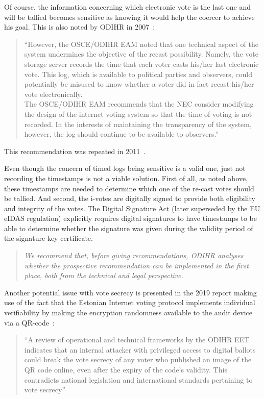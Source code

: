 \documentclass{llncs}
\begin{document}
Of course, the information concerning which  electronic vote is the last one and will be tallied becomes sensitive as knowing it would help the coercer to achieve his goal. This is also noted by ODIHR in 2007~\cite{ODIHR2007}:
\begin{quote}
    ``However, the OSCE/ODIHR EAM noted that one technical aspect of the system undermines the objective of the recast possibility. Namely, the vote storage server records the time that each voter casts his/her last electronic vote. This log, which is available to political parties and observers, could potentially be misused to know whether a voter did in fact recast his/her vote electronically. \\[1ex]
    The OSCE/ODIHR EAM recommends that the NEC consider modifying the design of the internet voting system so that the time of voting is not recorded. In the interests of maintaining the transparency of the system, however, the log should continue to be available to observers.''
\end{quote}
This recommendation was repeated in 2011~\cite{ODIHR2011}.

Even though the concern of timed logs being sensitive is a valid one, just not recording the timestamps is not a viable solution. First of all, as noted above, these timestamps are needed to determine which one of the re-cast votes should be tallied. And second, the i-votes are digitally signed to provide both eligibility and integrity of the votes. The Digital Signature Act (later superseded by the EU eIDAS regulation) explicitly requires digital signatures to have timestamps to be able to determine whether the signature was given during the validity period of the signature key certificate.

\begin{quote}
    \emph{We recommend that, before giving recommendations, ODIHR analyses whether the prospective recommendation can be implemented in the first place, both from the technical and legal perspective.}
\end{quote}

Another potential issue with vote secrecy is presented in the 2019 report making use of the fact that the Estonian Internet voting protocol implements individual verifiability by making the encryption randomness available to the audit device via a QR-code~\cite{ODIHR2019}:

\begin{quote}
    ``A review of operational and technical frameworks by the ODIHR EET indicates that an internal attacker with privileged access to digital ballots could break the vote secrecy of any voter who published an image of the QR code online, even after the expiry of the code's validity. This contradicts national legislation and international standards pertaining to vote secrecy''
\end{quote}
\end{document}
